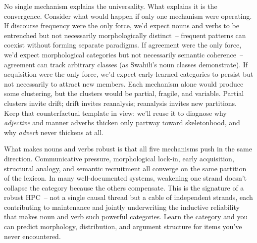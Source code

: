 No single mechanism explains the universality. What explains it is the convergence. Consider what would happen if only one mechanism were operating. If discourse frequency were the only force, we'd expect nouns and verbs to be entrenched but not necessarily morphologically distinct~-- frequent patterns can coexist without forming separate paradigms. If agreement were the only force, we'd expect morphological categories but not necessarily semantic coherence~-- agreement can track arbitrary classes (as Swahili's noun classes demonstrate). If acquisition were the only force, we'd expect early-learned categories to persist but not necessarily to attract new members. Each mechanism alone would produce some clustering, but the clusters would be partial, fragile, and variable. Partial clusters invite drift; drift invites reanalysis; reanalysis invites new partitions. Keep that counterfactual template in view: we'll reuse it to diagnose why \emph{adjective} and manner adverbs thicken only partway toward skeletonhood, and why \emph{adverb} never thickens at all.

What makes nouns and verbs robust is that all five mechanisms push in the same direction. Communicative pressure, morphological lock-in, early acquisition, structural analogy, and semantic recruitment all converge on the same partition of the lexicon. In many well-documented systems, weakening one strand doesn't collapse the category because the others compensate. This is the signature of a robust HPC~-- not a single causal thread but a cable of independent strands, each contributing to maintenance and jointly underwriting the inductive reliability that makes noun and verb such powerful categories. Learn the category and you can predict morphology, distribution, and argument structure for items you've never encountered.

